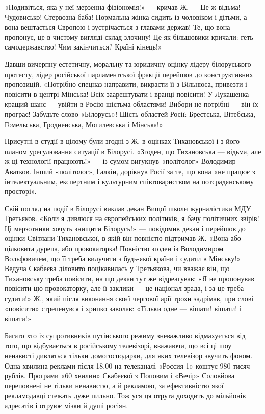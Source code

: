 «Подивіться, яка у неї мерзенна фізіономія!»  — кричав Ж. — Це ж відьма!
Чудовисько!  Стервозна баба!  Нормальна жінка сидить із чоловіком і дітьми, а
вона вештається Європою і зустрічається з главами держав!  Те, що вона
пропонує, це в чистому вигляді склад злочину!  Це як більшовики кричали: геть
самодержавство!  Чим закінчиться?  Країні кінець!»

Давши вичерпну естетичну, моральну та юридичну оцінку лідеру білоруського
протесту, лідер російської парламентської фракції перейшов до конструктивних
пропозицій. «Потрібно спецназ направити, викрасти її з Вільнюса, привезти і
повісити в центрі Мінська!  Всіх заарештувати і вранці повісити!  У Лукашенка
кращий шанс — увійти в Росію шістьма областями!  Вибори не потрібні — він їх
програє!  Забудьте слово «Білорусь»!  Шість областей Росії: Брестська,
Вітебська, Гомельська, Гродненська, Могилевська і Мінська!»

Присутні в студії в цілому були згодні з Ж. в оцінках Тихановської і з його
планом урегулювання ситуації в Білорусі. «Згоден, що Тихановська — відьма, але
ж ці технології працюють!»  — із сумом вигукнув «політолог» Володимир Аватков.
Інший «політолог», Галкін, дорікнув Росії за те, що вона «не працює з
інтелектуальним, експертним і культурним співтовариством на потсрадянському
просторі».

Свій погляд на події в Білорусі виклав декан Вищої школи журналістики МДУ
Третьяков.  «Коли я дивлюся на європейських політиків, я бачу політичних
звірів! Ці мерзотники хочуть знищити Білорусь!»  — повідомив декан і перейшов
до оцінки Світлани Тихановської, в якій він повністю підтримав Ж. «Вона або
цілковита дурепа, або провокаторка! Повністю згоден із Володимиром Вольфовичем,
що її треба вилучити з будь-якої країни і судити в Мінську!»  Ведуча Скабеєва
діловито поцікавилась у Третьякова, чи вважає він, що Тихановську треба
повісити, на що декан тут же відреагував: «Я не пропонував повісити цю
провокаторку, але її заклики — це націонал-зрада, і за це треба судити!» Ж.,
який після виконання своєї чергової арії трохи задрімав, при слові «повісити»
стрепенувся і хрипко заволав: «Тільки одне — вішати!  вішати! і вішати!»

Багато хто із супротивників путінського режиму зневажливо відмахується від
того, що відбувається в російському телевізорі, вважаючи, що всі ці шоу
ненависті дивляться тільки домогосподарки, для яких телевізор звучить фоном.
Одна хвилина реклами після 18.00 на телеканалі «Россия 1» коштує 980 тисяч
рублів.  Програми «60 хвилин» Скабеєвої з Поповим і «Вечір» Соловйова
переповнені не тільки ненавистю, а й рекламою, за ефективністю якої
рекламодавці стежать дуже пильно. Тож уся ця отрута доходить до мільйонів
адресатів і отруює мізки й душі росіян.


